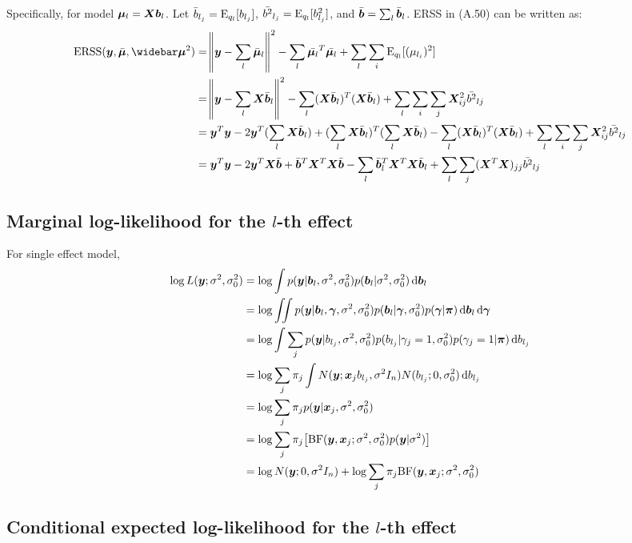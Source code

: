 Specifically, for \susie model $\bm \mu_l = \bm X \bm b_l$. Let $\bar{b}_{l_j} = \text{E}_{q_l}[b_{l_j}]$, $\bar{b^2}_{l_j} = \text{E}_{q_l}[b^2_{l_j}]$, and $\bar{\bm{b}} = \sum_l \bar{\bm{b}}_{l}$. ERSS in (A.50) can be written as:
\begin{align}
    \ERSS(\vy,\emu,\emusq) &= \norm{\vy-\sum_l \emul}^2 - \sum_l \bar{\vmu_l}^T \bar{\vmu_l} + \sum_l \sum_i \E_{q_l}[(\mu_{l_i})^2] \\
    &= \norm{\vy-\sum_l \mx \vbb_l}^2 - \sum_l (\mx \vbb_l)^T (\mx \vbb_l) + \sum_l \sum_i \sum_{j} \mx_{ij}^{2}  \bbb_{lj} \\
    &= \vy^T\vy - 2 \vy^T (\sum_l \mx \vbb_l) + (\sum_l \mx \vbb_l)^T(\sum_l \mx \vbb_l) - \sum_l (\mx \vbb_l)^T (\mx \vbb_l) + \sum_l \sum_i \sum_{j} \mx_{ij}^{2}  \bbb_{lj} \\
    &= \vy^T\vy - 2 \vy^T\mx \bar{\vb} + \bar{\vb}^T \mx^T\mx \bar{\vb} - \sum_l \bar{\vb}_l^T \mx^T \mx \bar{\vb}_l + \sum_l \sum_j (\mx^T \mx)_{jj} \bar{b^2}_{lj} \label{eqn:erss}
\end{align}

\subsection{Marginal log-likelihood for the $l$-th effect}

For single effect model,
\begin{align}
    \log L(\vy; \rv, \rv_0) &= \log \int p(\vy | \vb_l, \rv, \rv_0) p(\vb_l | \rv, \rv_0) \dif \vb_l\\
    &= \log \iint p(\vy | \vb_l, \vgamma, \rv, \rv_0) p(\vb_l | \vgamma, \rv_0) p(\vgamma | \vpi)  \dif \vb_l \dif \vgamma \\
    &= \log \int \sum_j p(\vy | b_{l_j}, \rv, \rv_0) p(b_{l_j}|\gamma_j = 1, \rv_0) p(\gamma_j = 1 | \vpi) \dif b_{l_j} \\
    &= \log \sum_j \pi_j \int N(\vy; \vx_jb_{l_j}, \rv I_n) N(b_{l_j}; 0, \rv_0) \dif b_{l_j} \\
    &= \log \sum_j \pi_j p(\vy|\vx_j, \rv, \rv_0) \\
    &= \log \sum_j \pi_j \big[\BF(\vy, \vx_j; \rv, \rv_0)p(\vy|\rv) \big]\\
    &= \log N(\vy; 0, \rv I_n) + \log \sum_j \pi_j \BF(\vy, \vx_j; \rv, \rv_0) \label{eqn:lmarginal}
\end{align}

\subsection{Conditional expected log-likelihood for the $l$-th effect}

